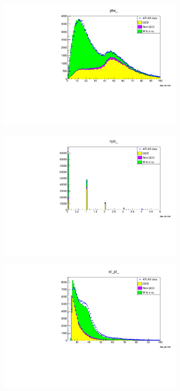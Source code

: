     \begin{figure}[H]
        \begin{subfigure}{0.5\textwidth}
            \includegraphics[width=\textwidth]{../W_mass/ptw_100_0_100_qcd0-42.pdf}
        \end{subfigure}
        \begin{subfigure}{0.5\textwidth}
            \includegraphics[width=\textwidth]{../W_mass/njet_100_0_5_qcd0-42.pdf}
        \end{subfigure}
        \begin{subfigure}{0.5\textwidth}
            \includegraphics[width=\textwidth]{../W_mass/elpt_100_25_100_qcd0-35.pdf}

\end{subfigure}
\end{figure}
